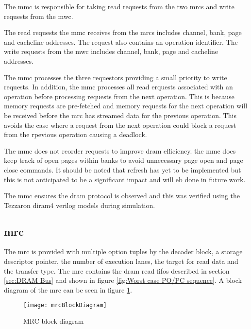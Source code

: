 The \ac{mmc} is responsible for taking read requests from the two \acp{mrc} and write requests from the \ac{mwc}.

The read requests the \ac{mmc} receives from the \acp{mrc} includes channel, bank, page and cacheline addresses. 
The request also contains an operation identifier.
The write requests from the \ac{mwc} includes channel, bank, page and cacheline addresses. 

The \ac{mmc} processes the three requestors providing a small priority to write requests.
In addition, the \ac{mmc} processes all read erquests associated with an operation before processing requests from the next operation.
This is because memory requests are pre-fetched and memory requests for the next operation will be received before the \ac{mrc} has streamed data for the previous operation.
This avoids the case where a request from the next operation could block a request from the rpevious operation causing a deadlock.

The \ac{mmc} does not reorder requests to improve \ac{dram} efficiency. 
the \ac{mmc} does keep track of open pages within banks to avoid unnecessary page open and page close commands.
It should be noted that refresh has yet to be implemented but this is not anticipated to be a significant impact and will eb done in future work.

The \ac{mmc} ensures the \ac{dram} protocol is observed and this was verified using the Tezzaron \ac{diram4} verilog models during simulation.


\subsection{\Acf{mrc}}
\label{sec:MRC}

The \ac{mrc} is provided with multiple option tuples by the decoder block, a storage descriptor pointer, the number of execution lanes, the target for read data and the transfer type.
The \ac{mrc} contains the \ac{dram} read \acp{fifo} described in section \ref{sec:DRAM Bus} and shown in figure \ref{fig:Worst case PO/PC sequence}.
A block diagram of the \ac{mrc} can be seen in figure \ref{fig:MRC block diagram}.
\begin{figure}[h]
\centering
\captionsetup{justification=centering}
\captionsetup{width=.9\linewidth}
\centerline{
\mbox{\texttt{[image: mrcBlockDiagram]}}
}
\center\caption{MRC block diagram}
\label{fig:MRC block diagram}
\end{figure}

